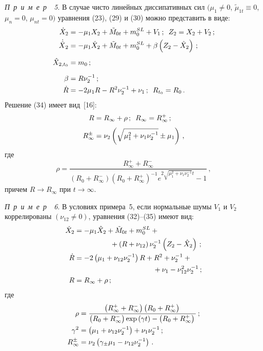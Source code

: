 \begin{multicols}{2}
 
 \textit{ П\ р\ и\ м\ е\ р~~5\/}. В случае чисто линейных диссипативных
 сил $(\mu_1 \ne 0$, $ \tilde\mu_{1t} \equiv 0$, $\mu_n=0$,
 $\mu_{nt}=0)$ уравнения (23), (29) и (30) можно представить в виде:
 \begin{align}
 \dot X_2 &=-\mu_1 X_2 +\tilde M_{0t} +m_0^{SL} + V_1\,;\enskip
 Z_2 = X_2 +V_2\,; \notag \\ %
 {\dot{\hat X}}_2 &=-\mu_1 \hat X_2+ \tilde M_{0t} +m_0^{SL} +\beta \left(Z_2 -\hat X_2\right)\,;\notag\\[-6pt]
&\label{e55}\\[-6pt]
 \hat X_{2, t_0} &= m_0\,;\notag\\[6pt]
 \beta&= R\nu_2^{-1}\,;\label{e56}\\
 \dot R &=- 2\mu_1 R - R^2 \nu_2^{-1} +\nu_1\,;\enskip R_{t_0} = R_0\,.\label{e57}
 \end{align}
Решение (34) имеет вид~[16]:
 \begin{align}
 R&= R_\infty +\rho\,;\enskip R_\infty = R_\infty^+\,;\notag\\[-6pt]
 &\label{e58}\\[-6pt]
 R_\infty^\pm &=\nu_2 \left(\sqrt{\mu_1^2 +\nu_1\nu_2^{-1}} \pm \mu_1\right)\,,\notag
 \end{align}
где\\[-6pt]
 $$\rho=\frac{R_\infty^+ + R_\infty^-}{\left(R_0 +R_\infty^-\right)\left(R_0 +R_\infty^+\right)^{-1}
e^{2\sqrt{\mu_1^2 +\nu_1\nu_2^{-1}} t}-1}\,,$$
причем $ R\to R_\infty$ при $t\to\infty$.

 \textit{ П\ р\ и\ м\ е\ р~~6\/}. В условиях примера~5, если нормальные
 шумы $V_1$ и $V_2$ коррелированы $(\nu_{12}\ne 0)$, уравнения (32)--(35)
 имеют вид:
  \begin{align*}
 \dot X_2 &=-\mu_1 \hat X_2 +\tilde M_{0t} +m_0^{SL} +{} \\
&\hspace*{50pt}  {}+\left(R+\nu_{12}\right) \nu_2^{-1} \left(Z_2 -\hat X_2\right)\,;\\ %
 \dot R &=- 2\left(\mu_1 +\nu_{12} \nu_2^{-1}\right)R+R^2 +\nu_2^{-1} +{}\\
 &\hspace*{110pt}{}+\nu_1- \nu_{12}^2 \nu_2^{-1}\,;\\ %
 R&= R_\infty +\rho\,;\notag
 \end{align*}
где
\begin{align*}
 \rho &=\fr{ \left(R_\infty^+ + R_\infty^-\right) \left(R_0 + R_\infty^+\right)}{\left(R_0 +R_\infty^-\right)
 \exp \left(\gamma t\right) - \left(R_0+R_\infty^+\right)}\,;\notag\\
 \gamma^2 &= \left(\mu_1 +\nu_{12} \nu_2^{-1}\right) + \nu_1 \nu_2^{-1}\,;\notag\\
 R_\infty^\pm &=\nu_2 \left(\gamma_\pm \mu_1 - \nu_{12}\nu_2^{-1}\right)\,. %
 \end{align*}


\end{multicols}
